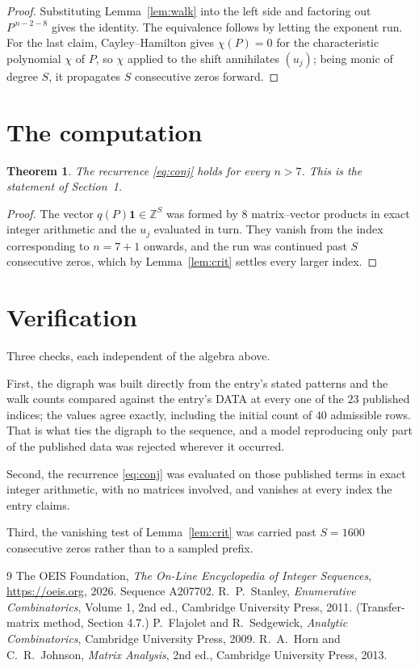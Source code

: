 \documentclass[11pt,a4paper]{article}
\theoremstyle{plain}
\newtheorem{theorem}{Theorem}
\theoremstyle{definition}
\begin{document}
\begin{proof}
Substituting Lemma~\ref{lem:walk} into the left side and factoring out
$P^{\,n-2-8}$ gives the identity. The equivalence follows by letting the exponent
run. For the last claim, Cayley--Hamilton gives $\chi(P)=0$ for the characteristic
polynomial $\chi$ of $P$, so $\chi$ applied to the shift annihilates $(u_j)$; being monic of
degree $S$, it propagates $S$ consecutive zeros forward.
\end{proof}

\section{The computation}

\begin{theorem}
The recurrence \eqref{eq:conj} holds for every $n>7$. This is the statement of
Section~1.
\end{theorem}

\begin{proof}
The vector $q(P)\mathbf{1}\in\mathbb{Z}^{S}$ was formed by $8$ matrix--vector
products in exact integer arithmetic and the $u_j$ evaluated in turn. They vanish from the
index corresponding to $n=7+1$ onwards, and the run was continued past $S$ consecutive
zeros, which by Lemma~\ref{lem:crit} settles every larger index.
\end{proof}

\section{Verification}

Three checks, each independent of the algebra above.

First, the digraph was built directly from the entry's stated patterns and the walk counts
compared against the entry's DATA at every one of the $23$ published indices; the
values agree exactly, including the initial count of $40$ admissible rows. That is
what ties the digraph to the sequence, and a model reproducing only part of the published
data was rejected wherever it occurred.

Second, the recurrence \eqref{eq:conj} was evaluated on those published terms in exact
integer arithmetic, with no matrices involved, and vanishes at every index the entry claims.

Third, the vanishing test of Lemma~\ref{lem:crit} was carried past $S=1600$ consecutive
zeros rather than to a sampled prefix.

\begin{thebibliography}{9}
 The OEIS Foundation, \emph{The On-Line Encyclopedia of Integer
Sequences}, \url{https://oeis.org}, 2026. Sequence A207702.
 R.~P.~Stanley, \emph{Enumerative Combinatorics}, Volume 1, 2nd ed.,
Cambridge University Press, 2011. (Transfer-matrix method, Section 4.7.)
 P.~Flajolet and R.~Sedgewick, \emph{Analytic Combinatorics}, Cambridge
University Press, 2009.
 R.~A.~Horn and C.~R.~Johnson, \emph{Matrix Analysis}, 2nd ed., Cambridge
University Press, 2013.
\end{thebibliography}
\end{document}
